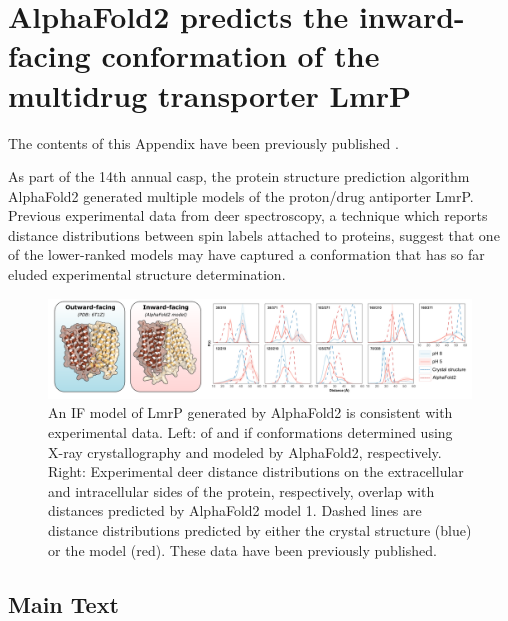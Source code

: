 \clearpage %

\chapter{AlphaFold2 predicts the inward-facing conformation of the multidrug transporter LmrP} \label{app:alphafold2}

The contents of this Appendix have been previously published \citep*{DelAlamo2021b}.

\bigskip

As part of the 14th annual \gls{casp}, the protein structure prediction algorithm AlphaFold2 generated multiple models of the proton/drug antiporter LmrP. Previous experimental data from \gls{deer} spectroscopy, a technique which reports distance distributions between spin labels attached to proteins, suggest that one of the lower-ranked models may have captured a conformation that has so far eluded experimental structure determination.

\begin{figure}[H]
\centering
\includegraphics[width=6.5in]{Figures/lmrp_data.pdf}
 \caption[An IF model of LmrP generated by AlphaFold2 is consistent with experimental data.]{An IF model of LmrP generated by AlphaFold2 is consistent with experimental data. Left: \Gls{of} and \gls{if} conformations determined using X-ray crystallography and modeled by AlphaFold2, respectively. Right: Experimental \gls{deer} distance distributions on the extracellular and intracellular sides of the protein, respectively, overlap with distances predicted by AlphaFold2 model 1. Dashed lines are distance distributions predicted by either the crystal structure (blue) or the model (red). These data have been previously published.}
\label{fig:lmrp_data}
\end{figure}

\section{Main Text}

